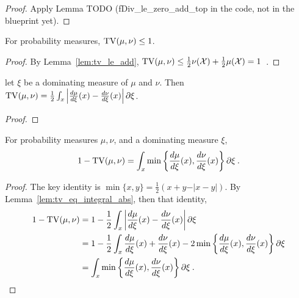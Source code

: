 \begin{proof}
Apply Lemma TODO (fDiv\_le\_zero\_add\_top in the code, not in the blueprint yet).
\end{proof}


\begin{lemma}
  \label{lem:tv_le_one}
  For probability measures,
  $\operatorname{TV}(\mu, \nu) \le 1$.
\end{lemma}

\begin{proof}
By Lemma~\ref{lem:tv_le_add}, $\operatorname{TV}(\mu, \nu) \le \frac{1}{2}\nu(\mathcal X) + \frac{1}{2}\mu(\mathcal X) = 1$~.
\end{proof}

\begin{lemma}
  \label{lem:tv_eq_integral_abs}
  let $\xi$ be a dominating measure of $\mu$ and $\nu$. Then
  $\operatorname{TV}(\mu, \nu) = \frac{1}{2}\int_x \left\vert \frac{d\mu}{d\xi}(x) - \frac{d\nu}{d\xi}(x) \right\vert \partial\xi$.
\end{lemma}

\begin{proof}%
\end{proof}

\begin{lemma}
  \label{lem:one_sub_tv_eq_integral_min}
  For probability measures $\mu, \nu$, and a dominating measure $\xi$,
  \begin{align*}
  1 - \operatorname{TV}(\mu, \nu)
  = \int_x \min\left\{ \frac{d\mu}{d\xi}(x), \frac{d\nu}{d\xi}(x)\right\}\partial \xi
  \: .
  \end{align*}
\end{lemma}

\begin{proof}%
{}
The key identity is $\min\{x, y\} = \frac{1}{2}\left(x + y - \vert x - y \vert\right)$.
By Lemma~\ref{lem:tv_eq_integral_abs}, then that identity,
\begin{align*}
1 - \operatorname{TV}(\mu, \nu)
&= 1 - \frac{1}{2}\int_x \left\vert \frac{d\mu}{d\xi}(x) - \frac{d\nu}{d\xi}(x)\right\vert \partial \xi
\\
&= 1 - \frac{1}{2}\int_x \frac{d\mu}{d\xi}(x) + \frac{d\nu}{d\xi}(x) - 2\min\left\{ \frac{d\mu}{d\xi}(x), \frac{d\nu}{d\xi}(x)\right\} \partial \xi
\\
&= \int_x \min\left\{ \frac{d\mu}{d\xi}(x), \frac{d\nu}{d\xi}(x)\right\}\partial \xi
\: .
\end{align*}
\end{proof}

